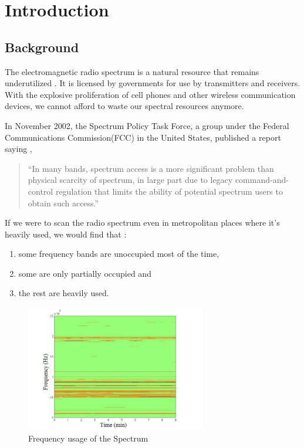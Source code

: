 \chapter{Introduction}
\section{Background}
The electromagnetic radio spectrum is a natural resource that remains 
underutilized \cite{haykin05}.
It is licensed by governments for use by transmitters and receivers.
With the explosive proliferation of cell phones and other wireless 
communication devices,
we cannot afford to waste our spectral resources anymore.

In November 2002, the Spectrum Policy Task Force, a group under the Federal
Communications Commission(FCC) in the United States, published a report saying
\cite{repFCC}, 
\begin{quote}
``In many bands, spectrum access is a more significant problem than physical 
scarcity of spectrum, in large part due to legacy command-and-control 
regulation that limits the ability of potential spectrum users to obtain such 
access.''
\end{quote}

If we were to scan the radio spectrum even in metropolitan places where it's
heavily used, 
we would find that \cite{staple04}:
\begin{enumerate}
	\item some frequency bands are unoccupied most of the time,
	\item some are only partially occupied and
	\item the rest are heavily used.
\end{enumerate}

\begin{figure}
\centering
\includegraphics[width=0.7\textwidth]{../images/freqUsage}
\caption{Frequency usage of the Spectrum}
\label{freqUsage}
\end{figure}

